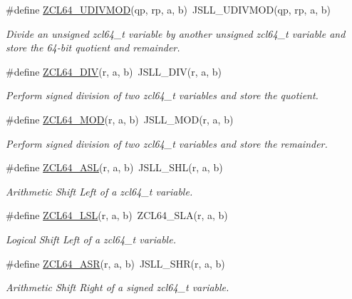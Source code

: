 \begin{DoxyCompactItemize}
\#define \hyperlink{group__zcl__64_ga6d2d3e13f94ca7fba869dbc6479ae0e1}{Z\-C\-L64\-\_\-\-U\-D\-I\-V\-M\-O\-D}(qp, rp, a, b)~J\-S\-L\-L\-\_\-\-U\-D\-I\-V\-M\-O\-D(qp, rp, a, b)
\begin{DoxyCompactList}\small\item\em Divide an unsigned zcl64\-\_\-t variable by another unsigned zcl64\-\_\-t variable and store the 64-\/bit quotient and remainder. \end{DoxyCompactList}\item 
\#define \hyperlink{group__zcl__64_gada2c215933ee366c11da80a44c2b27c7}{Z\-C\-L64\-\_\-\-D\-I\-V}(r, a, b)~J\-S\-L\-L\-\_\-\-D\-I\-V(r, a, b)
\begin{DoxyCompactList}\small\item\em Perform signed division of two zcl64\-\_\-t variables and store the quotient. \end{DoxyCompactList}\item 
\#define \hyperlink{group__zcl__64_ga8137418ffd91d5aae3b41a0143d27070}{Z\-C\-L64\-\_\-\-M\-O\-D}(r, a, b)~J\-S\-L\-L\-\_\-\-M\-O\-D(r, a, b)
\begin{DoxyCompactList}\small\item\em Perform signed division of two zcl64\-\_\-t variables and store the remainder. \end{DoxyCompactList}\item 
\#define \hyperlink{group__zcl__64_ga1a1bb5cd5b871acf8dd49621073cbd41}{Z\-C\-L64\-\_\-\-A\-S\-L}(r, a, b)~J\-S\-L\-L\-\_\-\-S\-H\-L(r, a, b)
\begin{DoxyCompactList}\small\item\em Arithmetic Shift Left of a zcl64\-\_\-t variable. \end{DoxyCompactList}\item 
\#define \hyperlink{group__zcl__64_ga6cc9903e90f4c3e3af0d5e4eef7c89a4}{Z\-C\-L64\-\_\-\-L\-S\-L}(r, a, b)~Z\-C\-L64\-\_\-\-S\-L\-A(r, a, b)
\begin{DoxyCompactList}\small\item\em Logical Shift Left of a zcl64\-\_\-t variable. \end{DoxyCompactList}\item 
\#define \hyperlink{group__zcl__64_gaffe142c28a6ecbe29416c4e0ba5f6a04}{Z\-C\-L64\-\_\-\-A\-S\-R}(r, a, b)~J\-S\-L\-L\-\_\-\-S\-H\-R(r, a, b)
\begin{DoxyCompactList}\small\item\em Arithmetic Shift Right of a signed zcl64\-\_\-t variable. \end{DoxyCompactList}\item 

\end{DoxyCompactItemize}
